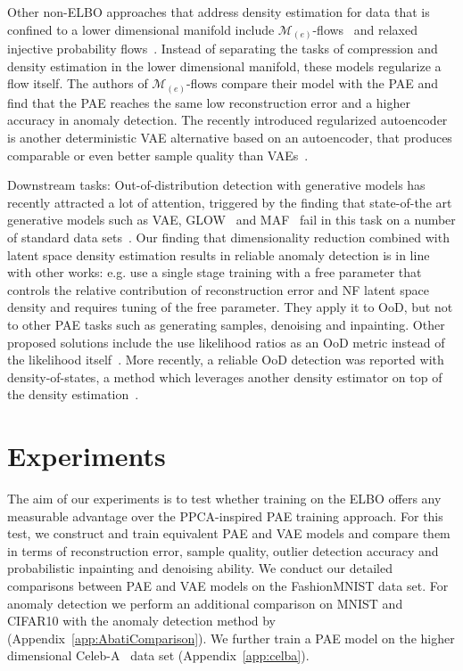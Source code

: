 \documentclass[10pt]{article} \usepackage[accepted]{tmlr}
\newcommand{\rev}[1]{{\color{black}#1}}
\begin{document}
Other non-ELBO approaches that address density estimation for data that is confined to a lower dimensional manifold include $\mathcal{M}_{(e)}$-flows~\citep{Brehmer2020} and relaxed injective probability flows~\citep{Kumar2020}. Instead of separating the tasks of compression and density estimation in the lower dimensional manifold, these models regularize a flow itself. The authors of $\mathcal{M}_{(e)}$-flows compare their model with the PAE and find that the PAE reaches the same low reconstruction error and a higher accuracy in anomaly detection. The recently introduced regularized autoencoder is another deterministic VAE alternative based on an autoencoder, that produces comparable or even better sample quality than VAEs~\citep{Gosh2020}.

Downstream tasks: Out-of-distribution detection with generative models has recently attracted a lot of attention, triggered by the finding that state-of-the art generative models such as VAE, GLOW~\citep{glow} and MAF~\citep{MAF} fail in this task on a number of standard data sets~\citep{Nalisnick2019}. \rev{Our finding that dimensionality reduction combined with latent space density estimation results in reliable anomaly detection is in line with other works: e.g. \cite{AbatiPCC19} use a single stage training with a free parameter that 
controls the relative contribution of 
reconstruction error and NF latent space density and requires tuning of the free 
parameter. They apply it to OoD, but not 
to other PAE tasks such as generating samples, denoising and inpainting.} Other proposed solutions include the use likelihood ratios as an OoD metric instead of the likelihood itself~\citep{Gosh2020}. More recently, a reliable OoD detection was reported with density-of-states, a method which leverages another density estimator on top of the density estimation~\citep{DensityofStates}. 
\section{Experiments}
The aim of our experiments is to test whether training on the ELBO offers any measurable advantage over the PPCA-inspired PAE training approach. For this test, we construct and train equivalent PAE and VAE models and compare them in terms of reconstruction error, sample quality, outlier detection accuracy and probabilistic inpainting and denoising ability. We conduct our detailed comparisons between PAE and VAE models on the FashionMNIST data set. For anomaly detection we perform an additional comparison on MNIST and CIFAR10 with the anomaly detection method by~\citet{AbatiPCC19} (Appendix~\ref{app:AbatiComparison}). We further train a PAE model on the higher dimensional Celeb-A~\citep{celeba} data set (Appendix~\ref{app:celba}).
\end{document}
